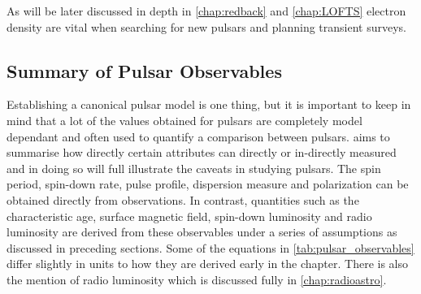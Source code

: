 As will be later discussed in depth in \cref{chap:redback} and \cref{chap:LOFTS} electron density are vital when searching for new pulsars and planning transient surveys. 


\subsection{Summary of Pulsar Observables}

Establishing a canonical pulsar model is one thing, but it is important to keep in mind that a lot of the values obtained for pulsars are completely model dependant and often used to quantify a comparison between pulsars.   aims to summarise how directly certain attributes can directly or in-directly measured and in doing so will full illustrate the caveats in studying pulsars. The spin period, spin-down rate, pulse profile, dispersion measure and polarization can be obtained directly from observations. In contrast, quantities such as the characteristic age, surface magnetic field, spin-down luminosity and radio luminosity are derived from these observables under a series of assumptions as discussed in preceding sections. Some of the equations in \cref{tab:pulsar_observables} differ slightly in units to how they are derived early in the chapter. There is also the mention of radio luminosity which is discussed fully in \cref{chap:radioastro}.

